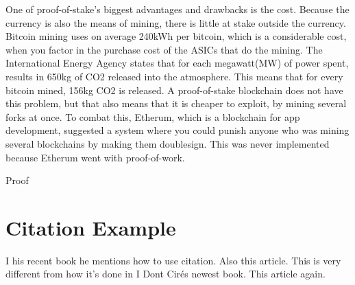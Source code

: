 \documentclass[11pt]{article}
\begin{document}
One of proof-of-stake's biggest advantages and drawbacks is the cost. Because the currency is also the means of mining, there is little at stake outside the currency. Bitcoin mining uses on average 240kWh per bitcoin, which is a considerable cost, when you factor in the purchase cost of the ASICs that do the mining. The International Energy Agency states that for each megawatt(MW) of power spent, results in 650kg of CO2 released into the atmosphere. This means that for every bitcoin mined, 156kg CO2 is released. A proof-of-stake blockchain does not have this problem, but that also means that it is cheaper to exploit, by mining several forks at once. To combat this, Etherum, which is a blockchain for app development, suggested a system where you could punish anyone who was mining several blockchains by making them doublesign. This was never implemented because Etherum went with proof-of-work. 

Proof



\section{Citation Example}

I his recent book he mentions how to use citation\cite{TEST:1}. Also this article\cite{ART:3}. This is very different from how it's done in I Dont Cir\'es newest book\cite{TEST:2}. This article again\cite{ART:3}. \cite{nakamoto2009bitcoin}

\newpage
 

\end{document}
